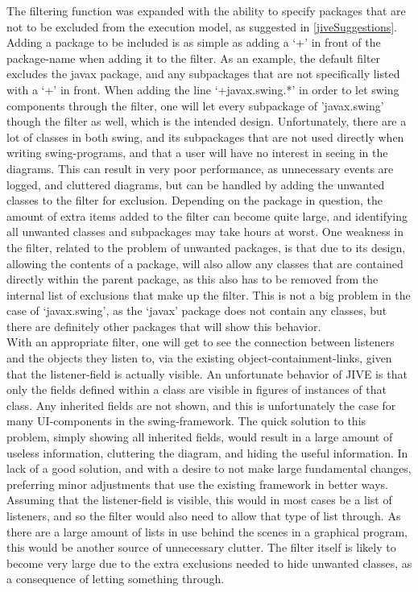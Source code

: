 The filtering function was expanded with the ability to specify packages that are not to be excluded from the execution model, as suggested in \autoref{jiveSuggestions}.
Adding a package to be included is as simple as adding a `+' in front of the package-name when adding it to the filter.
As an example, the default filter excludes the javax package, and any subpackages that are not specifically listed with a `+' in front.
When adding the line `+javax.swing.*' in order to let swing components through the filter, one will let every subpackage of 'javax.swing' though the filter as well, which is the intended design.
Unfortunately, there are a lot of classes in both swing, and its subpackages that are not used directly when writing swing-programs, and that a user will have no interest in seeing in the diagrams.
This can result in very poor performance, as unnecessary events are logged, and cluttered diagrams, but can be handled by adding the unwanted classes to the filter for exclusion.
Depending on the package in question, the amount of extra items added to the filter can become quite large, and identifying all unwanted classes and subpackages may take hours at worst.
One weakness in the filter, related to the problem of unwanted packages, is that due to its design, allowing the contents of a package, will also allow any classes that are contained directly within the parent package, as this also has to be removed from the internal list of exclusions that make up the filter.
This is not a big problem in the case of `javax.swing', as the `javax' package does not contain any classes, but there are definitely other packages that will show this behavior.
~\\

With an appropriate filter, one will get to see the connection between listeners and the objects they listen to, via the existing object-containment-links, given that the listener-field is actually visible.
An unfortunate behavior of JIVE is that only the fields defined within a class are visible in figures of instances of that class.
Any inherited fields are not shown, and this is unfortunately the case for many UI-components in the swing-framework.
The quick solution to this problem, simply showing all inherited fields, would result in a large amount of useless information, cluttering the diagram, and hiding the useful information.
In lack of a good solution, and with a desire to not make large fundamental changes, preferring minor adjustments that use the existing framework in better ways.
Assuming that the listener-field is visible, this would in most cases be a list of listeners, and so the filter would also need to allow that type of list through.
As there are a large amount of lists in use behind the scenes in a graphical program, this would be another source of unnecessary clutter.
The filter itself is likely to become very large due to the extra exclusions needed to hide unwanted classes, as a consequence of letting something through.
~\\


